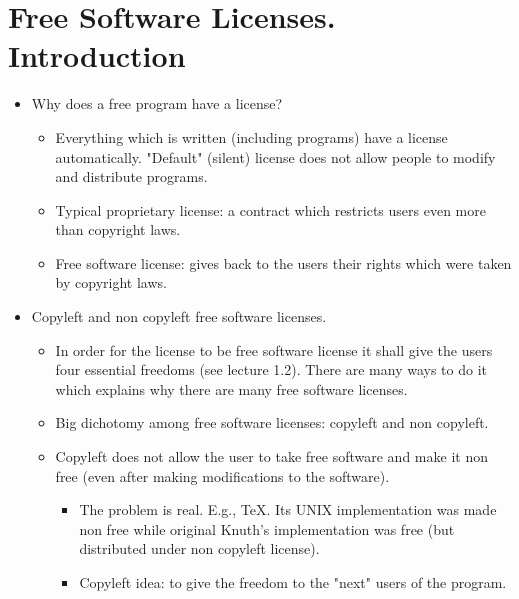 \documentclass[twoside,openright]{report}
\begin{document}
\section{Free Software Licenses. Introduction}
\begin{itemize}
\item    Why does a free program have a license?
\begin{itemize}
 \item        Everything which is written (including programs) have a license automatically. "Default" (silent) license does not allow people to modify and distribute programs.
 \item        Typical proprietary license: a contract which restricts users even more than copyright laws.
 \item        Free software license: gives back to the users their rights which were taken by copyright laws.
\end{itemize}
 \item    Copyleft and non copyleft free software licenses.
\begin{itemize}
 \item        In order for the license to be free software license it shall give the users four essential freedoms (see lecture 1.2). There are many ways to do it which explains why there are many free software licenses.
 \item        Big dichotomy among free software licenses: copyleft and non copyleft.
 \item        Copyleft does not allow the user to take free software and make it non free (even after making modifications to the software).
\begin{itemize}
 \item            The problem is real. E.g., \TeX. Its UNIX implementation was made non free while original Knuth's implementation was free (but distributed under non copyleft license).
 \item            Copyleft idea: to give the freedom to the "next" users of the program.
\end{itemize}
\end{itemize}
\end{itemize}
\end{document}

